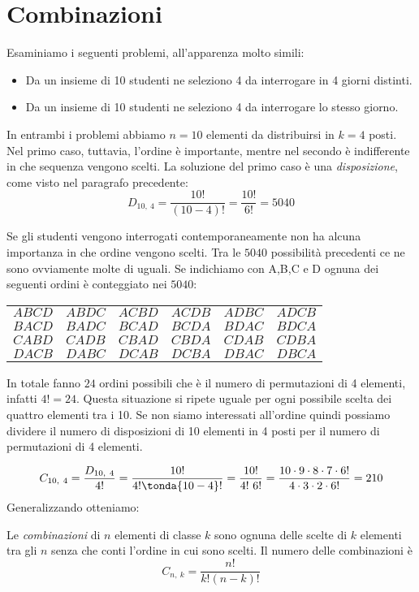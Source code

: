 \section{Combinazioni}
\label{sec:calc_combinatorio_combinazioni}
Esaminiamo i seguenti problemi, all'apparenza molto simili:
\begin{itemize}[noitemsep]
\item Da un insieme di 10 studenti ne seleziono 4 da interrogare in 4 giorni distinti.
\item Da un insieme di 10 studenti ne seleziono 4 da interrogare lo stesso giorno.
\end{itemize}
In entrambi i problemi abbiamo \(n=10\) elementi da distribuirsi in \(k=4\) posti. 
Nel primo caso, tuttavia, l'ordine è importante, mentre nel secondo 
è indifferente in che sequenza vengono scelti.
La soluzione del primo caso è una \emph{disposizione}, come visto nel paragrafo 
precedente:
\[D_{10,~4} = \dfrac{10!}{(10-4)!}=\dfrac{10!}{6!}=5040\]

Se gli studenti vengono interrogati contemporaneamente non ha alcuna importanza 
in che ordine vengono scelti. 
Tra le \(5040\) possibilità precedenti ce ne sono ovviamente molte di uguali. Se 
indichiamo con A,B,C e D ognuna dei seguenti ordini è conteggiato nei \(5040\):
\begin{center}
\begin{tabular}{cccccc}
\(A B C D\) & \(A B D C\) & \(A C B D\) & \(A C D B\) & \(A D B C \) & 
\(A D C B\)\\
\(B A C D\) & \(B A D C\) & \(B C A D\) & \(B C D A\) & \(B D A C \) & 
\(B D C A\)\\
\(C A B D\) & \(C A D B\) & \(C B A D\) & \(C B D A\) & \(C D A B \) & 
\(C D B A\)\\
\(D A C B\) & \(D A B C\) & \(D C A B\) & \(D C B A\) & \(D B A C \) & 
\(D B C A\)\\
\end{tabular}
\end{center}
In totale fanno \(24\) ordini possibili che è il numero di permutazioni di 4 
elementi, infatti \(4!=24\). Questa situazione si ripete uguale per ogni 
possibile scelta dei quattro elementi tra i 10. Se non siamo interessati 
all'ordine quindi possiamo dividere il numero di disposizioni di 10 
elementi in 4 posti per il numero di permutazioni di 4 elementi.

\[C_{10,~4} = \dfrac{D_{10,~4}}{4!} = \dfrac{10!}{4! \tonda{10 -4}!}=
\dfrac{10!}{4!~6!} = 
\dfrac{10 \cdot 9 \cdot 8 \cdot 7 \cdot 6!}{4 \cdot 3 \cdot 2 \cdot 6!} = 
210\]
Generalizzando otteniamo:
\begin{newdef}{}{}
Le \emph{combinazioni} di \(n\) elementi di classe \(k\) sono ognuna delle scelte 
di \(k\) elementi tra gli \(n\) senza che conti l'ordine in cui sono scelti. Il 
numero delle combinazioni è
\[C_{n,~k} =  \dfrac{n!}{k!(n-k)!}\]
\end{newdef}


